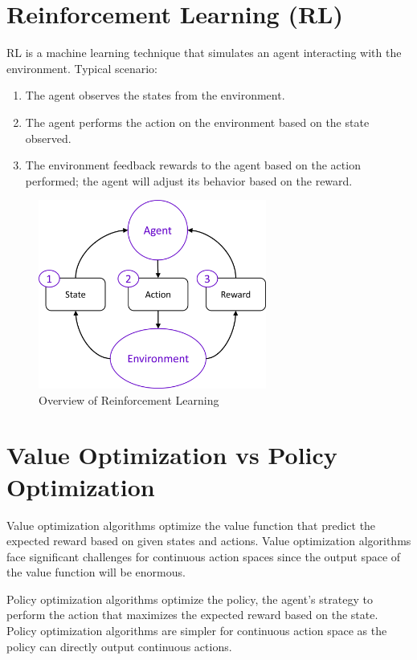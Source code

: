 \section{Reinforcement Learning (RL)}
RL is a machine learning technique that simulates an agent interacting with the environment. Typical scenario:
    \begin{enumerate}
        \item The agent observes the states from the environment.
        \item The agent performs the action on the environment based on the state observed.
        \item The environment feedback rewards to the agent based on the action performed; the agent will adjust its behavior based on the reward. 
    \end{enumerate}
\begin{figure}[ht]
  \centering\includegraphics[width=7.5cm]{images/rl_overview.png}
  \caption [Overview of Reinforcement Learning]
  {Overview of Reinforcement Learning
  }
  \label{fig:rl_overview_diagram}
\end{figure}

\section{Value Optimization vs Policy Optimization}
Value optimization algorithms optimize the value function that predict the expected reward based on given states and actions. Value optimization algorithms face significant challenges for continuous action spaces since the output space of the value function will be enormous.
\par
Policy optimization algorithms optimize the policy, the agent's strategy to perform the action that maximizes the expected reward based on the state. Policy optimization algorithms are simpler for continuous action space as the policy can directly output continuous actions.
